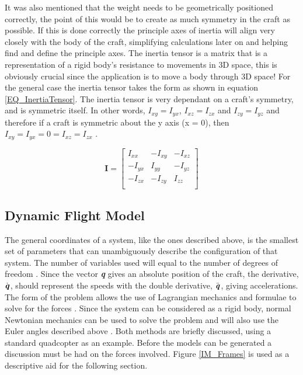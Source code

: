 	It was also mentioned that the weight needs to be geometrically positioned correctly, the point of this would be to create as much symmetry in the craft as possible. If this is done correctly the principle axes of inertia will align very closely with the body of the craft, simplifying calculations later on and helping find and define the principle axes. The inertia tensor is a matrix that is a representation of a rigid body's resistance to movements in 3D space, this is obviously crucial since the application is to move a body through 3D space! For the general case the inertia tensor takes the form as shown in equation \eqref{EQ_InertiaTensor}. The inertia tensor is very dependant on a craft's symmetry, and is symmetric itself. In other words, $I_{xy} = I_{yx}$, $I_{xz} = I_{zx}$ and $I_{zy} = I_{yz}$ and therefore if a craft is symmetric about the y axis (x = 0), then $I_{xy} = I_{yx} = 0 = I_{xz} = I_{zx}$ \cite{Luukkonen, MiniFlying}.
	
	\begin{equation}
	\label{EQ_InertiaTensor}
	\textbf{I} = 
	\begin{bmatrix}
	I_{xx}	& -I_{xy} & -I_{xz}\\
	-I_{yx}	& I_{yy}	& -I_{yz}\\
	-I_{zx}	& -I_{zy}	& I_{zz}\\
	\end{bmatrix}
	\end{equation}
	
	\subsection{Dynamic Flight Model}\label{SSECT_DynamicFLightModel}
	
	The general coordinates of a system, like the ones described above, is the smallest set of parameters that can unambiguously describe the configuration of that system. The number of variables used will equal to the number of degrees of freedom \cite{MIT}. 
	Since the vector \textbf{\textit{q}} gives an absolute position of the craft, the derivative, $\dot{\textbf{\textit{q}}}$, should represent the speeds with the double derivative, $\ddot{\textbf{\textit{q}}}$, giving accelerations. The form of the problem allows the use of Lagrangian mechanics and formulae to solve for the forces \cite{MIT, MiniFlying}. Since the system can be considered as  a rigid body, normal Newtonian mechanics can be used to solve the problem and will also use the Euler angles described above \cite{Luukkonen, Modelling}. Both methods are briefly discussed, using a standard quadcopter as an example. Before the models can be generated a discussion must be had on the forces involved.  Figure \ref{IM_Frames} is used as a descriptive aid for the following section.
	
